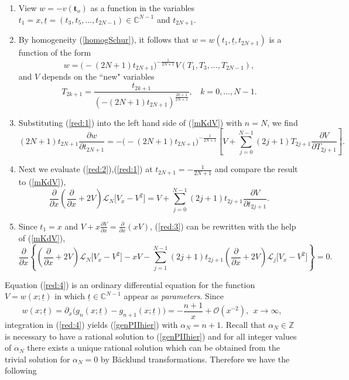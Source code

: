 \documentclass[10pt,reqno,oneside]{amsart}
\numberwithin{equation}{section}
\newtheorem{theo}{Theorem}[section]
\def\un{\underline}
\def\bt{\begin{theo}}
\def\L{\mathcal L}
\def\Z{{\mathbb Z}}
\def\eqref#1{(\ref{#1})}
\def\bt{{\mathbf t}}
\begin{document}
\begin{enumerate}
	\item[(i)] View $w=-v(\bt_o)$ as a function in the variables $t_1=x,\un t=(t_3,t_5,\ldots,t_{2N-1})\in\mathbb{C}^{N-1}$ and $t_{2N+1}$.
	\item[(ii)] By homogeneity \eqref{homogSchur}, it follows that $w=w(t_1,\un t,t_{2N+1})$ is a function of the form
	\begin{equation}\label{red:1}
		w=\big(-(2N+1)t_{2N+1}\big)^{-\frac{1}{2N+1}}V(T_1,T_3,\ldots,T_{2N-1}),
	\end{equation}
	and $V$ depends on the ``new" variables
	\begin{equation*}
		T_{2k+1}=\frac{t_{2k+1}}{(-(2N+1)t_{2N+1})^{\frac{2k+1}{2N+1}}},\ \ \ \ k=0,\ldots,N-1.
	\end{equation*}
	\item[(iii)] Substituting \eqref{red:1} into the left hand side of \eqref{mKdV} with $n=N$, we find
	\begin{equation}\label{red:2}
		(2N+1)t_{2N+1}\frac{\partial w}{\partial t_{2N+1}}=-\big(-(2N+1)t_{2N+1}\big)^{-\frac{1}{2N+1}}\left[V+\sum_{j=0}^{N-1}(2j+1)T_{2j+1}\frac{\partial V}{\partial T_{2j+1}}\right].
	\end{equation}
	\item[(iv)] Next we evaluate \eqref{red:2},\eqref{red:1} at $t_{2N+1}=-\frac{1}{2N+1}$ and compare the result to \eqref{mKdV},
	\begin{equation}\label{red:3}
		\frac{\partial}{\partial x}\left(\frac{\partial}{\partial x}+2V\right)\L_N\big[V_x-V^2\big]=V+\sum_{j=0}^{N-1}(2j+1)t_{2j+1}\frac{\partial V}{\partial t_{2j+1}}.
	\end{equation}
	\item[(v)] Since $t_1=x$ and $V+x\frac{\partial V}{\partial x} = \frac{\partial}{\partial x}(xV)$, \eqref{red:3} can be rewritten with the help of \eqref{mKdV},
	\begin{equation}\label{red:4}
		\frac{\partial}{\partial x}\left\{\left(\frac{\partial }{\partial x}+2V\right)\L_N\big[V_x-V^2\big]-xV-\sum_{j=1}^{N-1}(2j+1)t_{2j+1}\left(\frac{\partial}{\partial x}+2V\right)\L_j\big[V_x-V^2\big]\right\}=0.
	\end{equation}
\end{enumerate}
Equation \eqref{red:4} is an ordinary differential equation for the function $V=w(x;\un t)$ in which $\un t\in\mathbb{C}^{N-1}$ appear as {\it parameters}. Since
\begin{equation*}
	w(x;\un t)=\partial_x\big(g_n(x;\un t)-g_{n+1}(x;\un t)\big)=-\frac{n+1}{x}+\mathcal{O}\left(x^{-2}\right),\ \ x\rightarrow\infty,
\end{equation*}
integration in \eqref{red:4} yields \eqref{genPIIhier} with $\alpha_N=n+1$. Recall \cite{DK1,DK2} that $\alpha_N\in \Z$ is necessary to have a rational solution to \eqref{genPIIhier} and for all 
integer values of $\alpha_N$ there exists a unique rational solution which can be obtained from the trivial solution for $\alpha_N=0$ by B\"acklund transformations. Therefore we have the following
\end{document}
